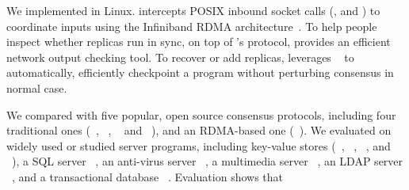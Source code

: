 


We implemented \xxx in Linux. \xxx intercepts POSIX inbound socket calls
(\eg, \accept and \recv) to coordinate inputs using the Infiniband
RDMA architecture~\cite{infiniband}. To help people inspect whether replicas 
run in sync, on top of \xxx's \paxos protocol, \xxx provides an efficient 
network output checking tool. To recover or add replicas, \xxx 
leverages \criu~\cite{criu} to automatically, efficiently checkpoint a program 
without perturbing consensus in normal case.


We compared \xxx with five popular, open source consensus protocols,
including four traditional ones (\libpaxos~\cite{libpaxos},
\zookeeper~\cite{zookeeper}, \crane~\cite{crane:sosp15} and
\spaxos~\cite{spaxos:srds12}), and an RDMA-based one 
(\dare~\cite{dare:hpdc15}). We evaluated \xxx on \nprog widely used or studied 
server programs, including
\nkvprog key-value stores (\redis~\cite{redis}, \memcached~\cite{memcached},
\ssdb~\cite{ssdb}, and \mongodb~\cite{mongodb}), a SQL server
\mysql~\cite{mysql}, an anti-virus server \clamav~\cite{clamav}, a multimedia
server \mediatomb~\cite{mediatomb}, an LDAP server \openldap~\cite{openldap}, 
and a transactional database \calvin~\cite{calvin:sigmod12}. Evaluation shows 
that


